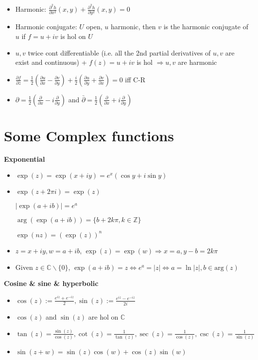 \documentclass[10pt,a4paper]{article}
\begin{document}
\begin{multicols}{2}
\begin{itemize}
    \item Harmonic: $\displaystyle \frac{\partial^2h}{\partial x^2}(x,y) + \frac{\partial^2h}{\partial y^2}(x,y) = 0$
    \item Harmonic conjugate: $U$ open, $u$ harmonic, then $v$ is the harmonic conjugate of $u$ if $f=u+iv$ is hol on $U$
    \item $u,v$ twice cont differentiable (i.e. all the 2nd partial derivatives of $u,v$ are exist and continuous) + $f(z)=u+iv$ is hol $\Rightarrow u,v$ are harmonic 
    
    \item $\frac{\partial f}{\partial \bar z} = \frac{1}{2} (\frac{\partial u}{\partial x} - \frac{\partial v}{\partial y}) + \frac{i}{2} (\frac{\partial u}{\partial y} + \frac{\partial v}{\partial x})=0$ iff C-R
    
    \item $\partial = \frac{1}{2} (\frac{\partial}{\partial x} - i \frac{\partial}{\partial y})$ and $\bar \partial = \frac{1}{2} (\frac{\partial}{\partial x} + i \frac{\partial}{\partial y})$
\end{itemize}

\section{Some Complex functions}

\textbf{Exponential}
\begin{itemize}
    \item $\exp (z) = \exp (x+iy) = e^x (\cos y + i \sin y)$
    \item $\exp(z+2\pi i)= \exp(z)$
    
      $|\exp(a+ib)|=e^a$
     
      $\arg(\exp (a+ib)) = \{ b+2k\pi, k \in \mathbb Z \}$
    
      $\exp(nz)= (\exp(z))^n$
    \item $z=x+iy, w=a+ib$, $\exp(z)=\exp(w) \Rightarrow x=a, y-b=2k\pi$
    \item Given $z \in \mathbb C \backslash \{0\}$, $\exp(a+ib)=z \Leftrightarrow e^a=|z| \Leftrightarrow a=\ln |z|, b\in \text{arg}(z)$ 
\end{itemize}

\textbf{Cosine \& sine \& hyperbolic}
\begin{itemize}
    \item $\displaystyle \cos(z) := \frac{e^{iz}+e^{-iz}}{2}, \sin(z) := \frac{e^{iz}-e^{-iz}}{2i}$
\item $\cos(z)$ and $\sin(z)$ are hol on $\mathbb C$
\item $\tan(z)=\frac{\sin(z)}{\cos(z)}, \cot(z)=\frac{1}{\tan(z)}, \sec(z)=\frac{1}{\cos(z)}, \csc(z)=\frac{1}{\sin(z)}$
\item $\sin(z+w)=\sin(z)\cos(w)+\cos(z)\sin(w)$
  

\end{itemize}
\end{multicols}
\end{document}
